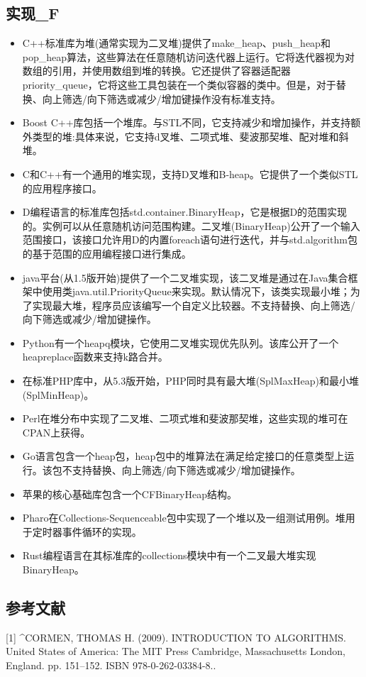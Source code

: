 \subsection{实现_F}
\begin{itemize}
\item C++标准库为堆(通常实现为二叉堆)提供了make_heap、push_heap和pop_heap算法，这些算法在任意随机访问迭代器上运行。它将迭代器视为对数组的引用，并使用数组到堆的转换。它还提供了容器适配器priority_queue，它将这些工具包装在一个类似容器的类中。但是，对于替换、向上筛选/向下筛选或减少/增加键操作没有标准支持。
\item Boost C++库包括一个堆库。与STL不同，它支持减少和增加操作，并支持额外类型的堆:具体来说，它支持d叉堆、二项式堆、斐波那契堆、配对堆和斜堆。
\item C和C++有一个通用的堆实现，支持D叉堆和B-heap。它提供了一个类似STL的应用程序接口。
\item D编程语言的标准库包括std.container.BinaryHeap，它是根据D的范围实现的。实例可以从任意随机访问范围构建。二叉堆(BinaryHeap)公开了一个输入范围接口，该接口允许用D的内置foreach语句进行迭代，并与std.algorithm包的基于范围的应用编程接口进行集成。
\item java平台(从1.5版开始)提供了一个二叉堆实现，该二叉堆是通过在Java集合框架中使用类java.util.PriorityQueue来实现。默认情况下，该类实现最小堆；为了实现最大堆，程序员应该编写一个自定义比较器。不支持替换、向上筛选/向下筛选或减少/增加键操作。
\item Python有一个heapq模块，它使用二叉堆实现优先队列。该库公开了一个heapreplace函数来支持k路合并。
\item 在标准PHP库中，从5.3版开始，PHP同时具有最大堆(SplMaxHeap)和最小堆(SplMinHeap)。
\item Perl在堆分布中实现了二叉堆、二项式堆和斐波那契堆，这些实现的堆可在CPAN上获得。
\item Go语言包含一个heap包，heap包中的堆算法在满足给定接口的任意类型上运行。该包不支持替换、向上筛选/向下筛选或减少/增加键操作。
\item 苹果的核心基础库包含一个CFBinaryHeap结构。
\item Pharo在Collections-Sequenceable包中实现了一个堆以及一组测试用例。堆用于定时器事件循环的实现。
\item Rust编程语言在其标准库的collections模块中有一个二叉最大堆实现BinaryHeap。
\end{itemize}

\subsection{参考文献}
[1]
^CORMEN, THOMAS H. (2009). INTRODUCTION TO ALGORITHMS. United States of America: The MIT Press Cambridge, Massachusetts London, England. pp. 151–152. ISBN 978-0-262-03384-8..

